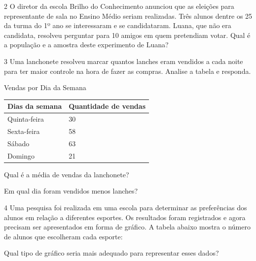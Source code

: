 \num{2} O diretor da escola Brilho do Conhecimento anunciou que as eleições
para representante de sala no Ensino Médio seriam realizadas. Três
alunos dentre os 25 da turma do 1º ano se interessaram e se
candidataram. Luana, que não era candidata, resolveu perguntar para 10
amigos em quem pretendiam votar. Qual é a população e a amostra deste
experimento de Luana?


\num{3} Uma lanchonete resolveu marcar quantos lanches eram vendidos a cada
noite para ter maior controle na hora de fazer as compras. Analise a
tabela e responda.

\begin{table}[H]
  \centering
  {Vendas por Dia da Semana}\smallskip\\
  \begin{tabular}{ll}
    \toprule
    Dias da semana & Quantidade de vendas \\
    \midrule
    Quinta-feira & 30 \\
    Sexta-feira & 58 \\
    Sábado & 63 \\
    Domingo & 21 \\
    \bottomrule
  \end{tabular}
\end{table} 

\begin{escolha}[itemsep=0pt]

    \item Qual é a média de vendas da lanchonete?\\

    \item Em qual dia foram vendidos menos lanches?\\

\end{escolha}

\num{4} Uma pesquisa foi realizada em uma escola para determinar as
preferências dos alunos em relação a diferentes esportes. Os resultados
foram registrados e agora precisam ser apresentados em forma de gráfico.
A tabela abaixo mostra o número de alunos que escolheram cada
esporte:

Qual tipo de gráfico seria mais adequado para representar esses dados?

